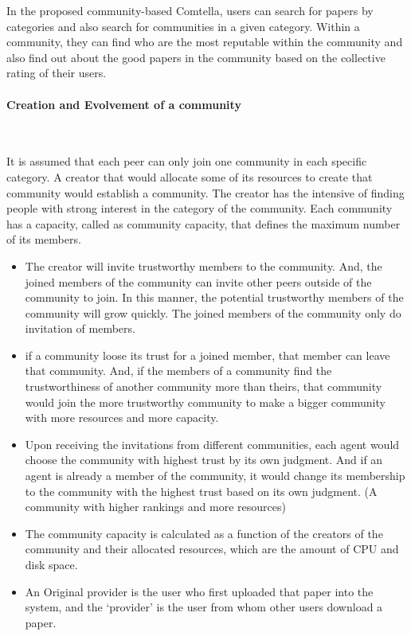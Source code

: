 \documentclass [12pt]{article} \usepackage{multicol}
\begin{document}
	In the proposed community-based Comtella, users can search for
papers by categories and also search for communities in a given
category. Within a community, they can find who are the most
reputable within the community and also find out about the good
papers in the community based on the collective rating of their
users.

\paragraph{Creation and Evolvement of a community}\mbox{}\\ \newline 

It is assumed that each peer can only join one community in each
specific category. A creator that would allocate some of its
resources to create that community would establish a community. The
creator has the intensive of finding people with strong interest in
the category of the community. Each community has a capacity, called
as community capacity, that defines the maximum number of its
members.

\begin{itemize}

\item	 The creator will invite trustworthy members to the community.
 And, the joined members of the community can invite other peers
 outside of the community to join. In this manner, the potential
 trustworthy members of the community will grow quickly. The joined
 members of the community only do invitation of members.

\item  if a community loose its trust for a joined member,
that member can leave that community. And, if the members of a
community find the trustworthiness of another community more than
theirs, that community would join the more trustworthy community to
make a bigger community with more resources and more capacity.

\item 	Upon receiving the invitations from different communities, each
agent would choose the community with highest trust by its own
judgment. And if an agent is already a member of the community, it
would change its membership to the community with the highest trust
based on its own judgment. (A community with higher rankings and more
resources)

\item The community capacity is calculated as a function of the
creators of the community and their allocated resources, which are
the amount of CPU and disk space.


\item 	An Original provider is the user who first uploaded that paper
into the system, and the ‘provider’ is the user from whom other users
download a paper.

\end{itemize}
\end{document}
